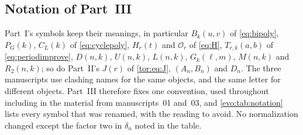 \documentclass[11pt,a4paper]{article}
\numberwithin{equation}{section}
\theoremstyle{definition}
\theoremstyle{remark}
\begin{document}
\subsection{Notation of Part~III}\label{evo:sec:notation}

Part~I's symbols keep their meanings, in particular $B_k(u,v)$ of
\eqref{eq:bipoly}, $P_G(k)$, $C_L(k)$ of \eqref{eq:cyclepoly}, $H_r(t)$ and
$\mathcal O_r$ of \eqref{eq:H}, $T_{r,k}(a,b)$ of \eqref{eq:periodimprove},
$D(n,k)$, $U(n,k)$, $L(n,k)$, $G_k(\ell,m)$, $M(n,k)$ and $R_2(n,k)$; so do
Part~II's $J(r)$ of \eqref{tor:eq:J}, $(A_n,B_n)$ and $D_n$. The three
manuscripts use clashing names for the same objects, and the same letter for
different objects. Part~III therefore fixes one convention, used throughout
including in the material from manuscripts~01 and~03, and
\cref{evo:tab:notation} lists every symbol that was renamed, with the reading
to avoid. No normalization changed except the factor two in $\delta_n$ noted
in the table.
\end{document}
